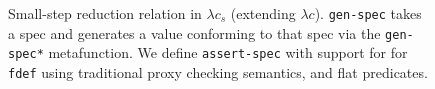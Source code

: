 \begin{figure}
\caption{Small-step reduction relation in $\lambda c_s$ (extending $\lambda c$).
  \texttt{gen-spec} takes a spec and generates a value conforming to that spec
  via the \texttt{gen-spec*} metafunction.
  We define \texttt{assert-spec} with support for 
for \texttt{fdef} using traditional proxy checking semantics, and flat predicates.}
  \label{arrowvspec}
\end{figure}

